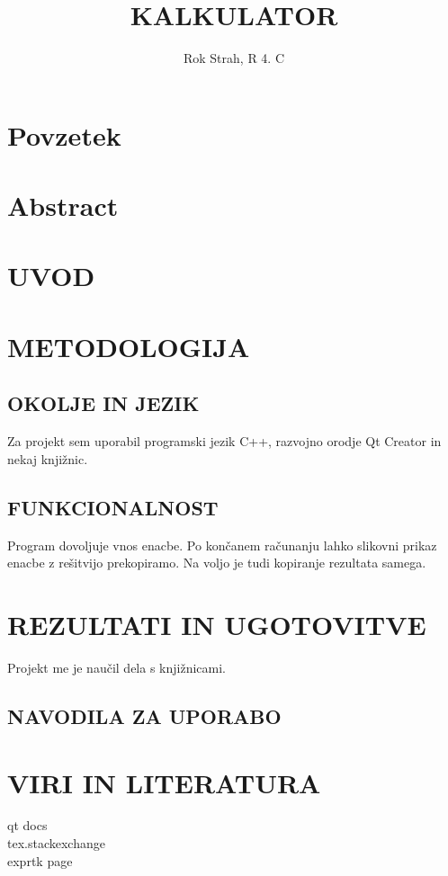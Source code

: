 \documentclass[12pt,titlepage,draft]{report}
\title{KALKULATOR}
\author{Rok Strah, R 4. C}
\begin{document}
\maketitle

\section*{Povzetek}
\section*{Abstract}
\thispagestyle{empty}


{\begin{spacing}{1.15}
\tableofcontents
\end{spacing}}
\thispagestyle{empty}
\clearpage
\setcounter{page}{1}

\section{\textbf{UVOD}}


\section{\textbf{METODOLOGIJA}}
\subsection{OKOLJE IN JEZIK}
Za projekt sem uporabil programski jezik C++, razvojno orodje Qt Creator in nekaj knjižnic.

\subsection{FUNKCIONALNOST}
Program dovoljuje vnos enacbe.
Po končanem računanju lahko slikovni prikaz enacbe z rešitvijo prekopiramo.
Na voljo je tudi kopiranje rezultata samega.


\section{\textbf{REZULTATI IN UGOTOVITVE}}
Projekt me je naučil dela s knjižnicami.

\subsection{NAVODILA ZA UPORABO}


\section{\textbf{VIRI IN LITERATURA}}
{qt docs}\\
{tex.stackexchange}\\
{exprtk page}\\
\end{document}
